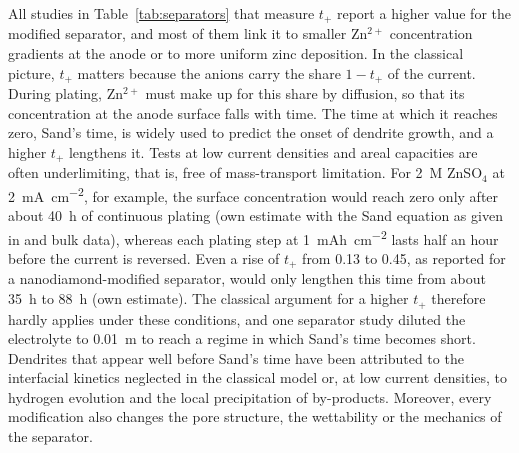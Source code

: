 All studies in Table~\ref{tab:separators} that measure $t_+$ report a higher value for the modified separator, and most of them link it to smaller Zn$^{2+}$ concentration gradients at the anode or to more uniform zinc deposition\cite{luo_regulating_2024,yuan_synergistic_2025}.
In the classical picture, $t_+$ matters because the anions carry the share $1-t_+$ of the current.
During plating, Zn$^{2+}$ must make up for this share by diffusion, so that its concentration at the anode surface falls with time.
The time at which it reaches zero, Sand's time\cite{sand_concentration_1901}, is widely used to predict the onset of dendrite growth, and a higher $t_+$ lengthens it\cite{yang_dendrite_2025}.
Tests at low current densities and areal capacities are often underlimiting, that is, free of mass-transport limitation\cite{rana_electroanalytical_2025}.
For \SI{2}{M} ZnSO$_4$ at \SI{2}{mA.cm^{-2}}, for example, the surface concentration would reach zero only after about \SI{40}{h} of continuous plating (own estimate with the Sand equation as given in\cite{yang_dendrite_2025} and bulk data\cite{albright_mutual_1975,purser_transference_1951}), whereas each plating step at \SI{1}{mAh.cm^{-2}} lasts half an hour before the current is reversed.
Even a rise of $t_+$ from 0.13 to 0.45, as reported for a nanodiamond-modified separator\cite{zhang_modulating_2024,zhang_qiuxia_2025}, would only lengthen this time from about \SI{35}{h} to \SI{88}{h} (own estimate).
The classical argument for a higher $t_+$ therefore hardly applies under these conditions, and one separator study diluted the electrolyte to \SI{0.01}{m} to reach a regime in which Sand's time becomes short\cite{su_printingscalable_2022}.
Dendrites that appear well before Sand's time have been attributed to the interfacial kinetics neglected in the classical model\cite{yang_dendrite_2025} or, at low current densities, to hydrogen evolution and the local precipitation of by-products\cite{rana_electroanalytical_2025}.
Moreover, every modification also changes the pore structure, the wettability or the mechanics of the separator.
